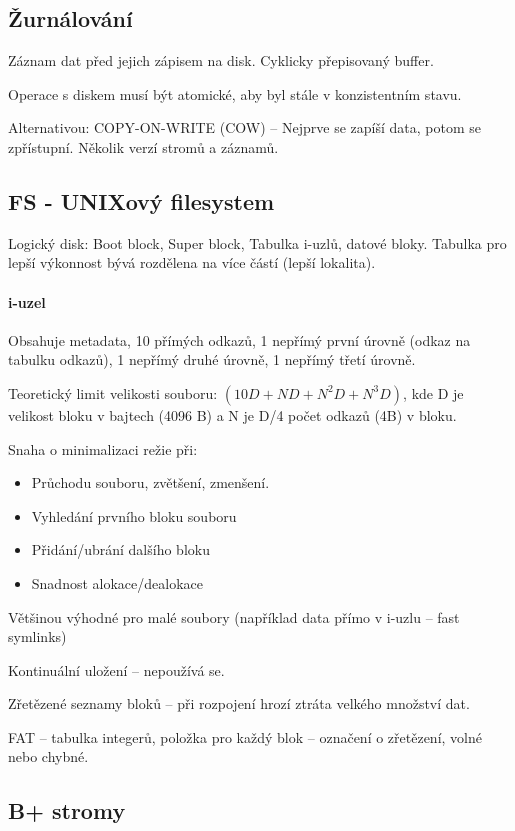 \documentclass[a4wide]{report}
\begin{document}
\subsection{Žurnálování}

Záznam dat před jejich zápisem na disk. Cyklicky přepisovaný buffer.

Operace s diskem musí být atomické, aby byl stále v konzistentním stavu.

Alternativou: COPY-ON-WRITE (COW) -- Nejprve se zapíší data, potom se zpřístupní. Několik verzí stromů a záznamů.

\subsection{FS - UNIXový filesystem}
Logický disk: Boot block, Super block, Tabulka i-uzlů, datové bloky. Tabulka pro lepší výkonnost bývá rozdělena na více částí (lepší lokalita).

\paragraph{i-uzel}

Obsahuje metadata, 10 přímých odkazů, 1 nepřímý první úrovně (odkaz na tabulku odkazů), 1 nepřímý druhé úrovně, 1 nepřímý třetí úrovně.

Teoretický limit velikosti souboru: $(10 D + N D + N^2 D + N^3 D)$, kde D je velikost bloku v bajtech (4096 B) a N je D/4 počet odkazů (4B) v bloku.

Snaha o minimalizaci režie při:
\begin{itemize}
	\item Průchodu souboru, zvětšení, zmenšení.
	\item Vyhledání prvního bloku souboru
	\item Přidání/ubrání dalšího bloku
	\item Snadnost alokace/dealokace
\end{itemize}

Většinou výhodné pro malé soubory (například data přímo v i-uzlu -- fast symlinks)

Kontinuální uložení -- nepoužívá se.

Zřetězené seznamy bloků -- při rozpojení hrozí ztráta velkého množství dat.

FAT -- tabulka integerů, položka pro každý blok -- označení o zřetězení, volné nebo chybné.

\subsection{B+ stromy}
\end{document}

